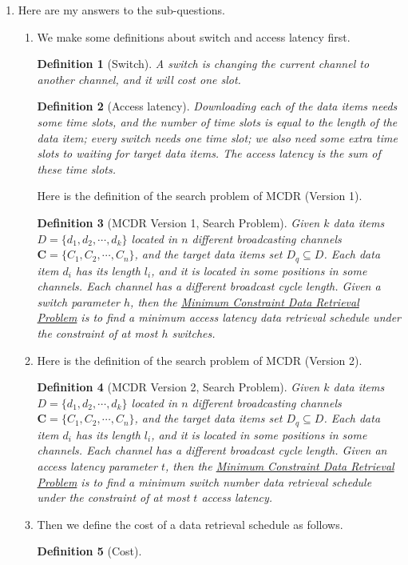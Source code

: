 \documentclass[12pt,a4paper]{article}
\makeatletter
\newtheorem*{solution}{Solution}
\newtheorem{definition}{Definition}
\theoremstyle{definition}
\renewenvironment{solution}[1][Solution] {\par\pushQED{\qed}\normalfont\topsep6\p@\@plus6\p@\relax\trivlist\item[\hskip\labelsep\bfseries#1\@addpunct{.}]\ignorespaces}{\popQED\endtrivlist\@endpefalse} \makeatother
\makeatother
\begin{document}
\begin{enumerate}
\begin{solution} Here are my answers to the sub-questions.
\begin{enumerate}
\item We make some definitions about switch and access latency first.
\begin{definition}[Switch]
A switch is changing the current channel to another channel, and it will cost one slot.
\end{definition}
\begin{definition}[Access latency]
Downloading each of the data items needs some time slots, and the number of time slots is equal to the length of the data item; every switch needs one time slot; we also need some extra time slots to waiting for target data items. The access latency is the sum of these time slots.
\end{definition}
Here is the definition of the search problem of MCDR (Version 1).
\begin{definition}[MCDR Version 1, Search Problem]
Given $k$ data items $D = \{d_1, d_2,\cdots, d_k\}$ located in $n$ different broadcasting channels $\mathbf{C}=\{C_1, C_2, \cdots, C_n\}$, and the target data items set $D_q \subseteq D$. Each data item $d_i$ has its length $l_i$, and it is located in some positions in some channels. Each channel has a different broadcast cycle length. Given a switch parameter $h$, then the \underline{Minimum Constraint Data Retrieval Problem} is to find a {\color{red}minimum access latency} data retrieval schedule under the constraint of at most $h$ switches.
\end{definition}
\item Here is the definition of the search problem of MCDR (Version 2).
\begin{definition}[MCDR Version 2, Search Problem]
Given $k$ data items $D = \{d_1, d_2,\cdots, d_k\}$ located in $n$ different broadcasting channels $\mathbf{C}=\{C_1, C_2, \cdots, C_n\}$, and the target data items set $D_q \subseteq D$. Each data item $d_i$ has its length $l_i$, and it is located in some positions in some channels. Each channel has a different broadcast cycle length. Given an access latency parameter $t$, then the \underline{Minimum Constraint Data Retrieval Problem} is to find a {\color{red}minimum switch number} data retrieval schedule under the constraint of at most $t$ access latency.
\end{definition}
\item Then we define the cost of a data retrieval schedule as follows.
\begin{definition}[Cost]

\end{definition}
\end{enumerate}
\end{solution}
\end{enumerate}
\end{document}
